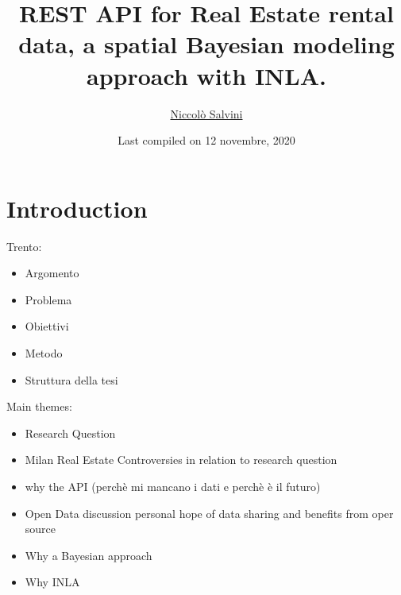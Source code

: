 \documentclass[
  12pt,
  a4paper,
  oneside]{book}
\title{REST API for Real Estate rental data, a spatial Bayesian modeling approach with INLA.}
\author{\href{https://niccolosalvini.netlify.app/}{Niccolò Salvini}}
\date{Last compiled on 12 novembre, 2020}
\providecommand{\tightlist}{%
  \setlength{\itemsep}{0pt}\setlength{\parskip}{0pt}}
\let\oldmaketitle\maketitle
\theoremstyle{definition}
\theoremstyle{definition}
\theoremstyle{definition}
\theoremstyle{remark}
\begin{document}
\maketitle


\newpage

\let\maketitle\oldmaketitle
\maketitle

{
\setcounter{tocdepth}{2}
\tableofcontents
}
\listoftables
\listoffigures
{}
\hypertarget{intro}{%
\chapter{Introduction}\label{intro}}

Trento:

\begin{itemize}
\tightlist
\item
  Argomento
\item
  Problema
\item
  Obiettivi
\item
  Metodo
\item
  Struttura della tesi
\end{itemize}

Main themes:

\begin{itemize}
\tightlist
\item
  Research Question
\item
  Milan Real Estate Controversies in relation to research question
\item
  why the API (perchè mi mancano i dati e perchè è il futuro)
\item
  Open Data discussion personal hope of data sharing and benefits from oper source
\item
  Why a Bayesian approach
\item
  Why INLA
\end{itemize}
\end{document}
